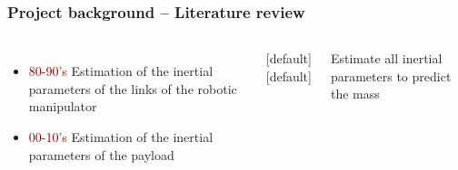 \documentclass[aspectratio=1610]{beamer}
\begin{document}
\begin{frame}
\frametitle{Project background – Literature review}
\begin{columns}
\column{37em}
\begin{itemize}\itemsep1em
  \justifying
  \item \textcolor{darkred}{80-90's} Estimation of the inertial parameters of the links of the robotic manipulator
  \item \textcolor{darkred}{00-10's} Estimation of the inertial parameters of the payload
\end{itemize}


[default]
[default]

\begin{block}{}
Estimate all inertial parameters to predict the mass
\end{block}



\end{columns}
\end{frame}
%
%
\end{document}
